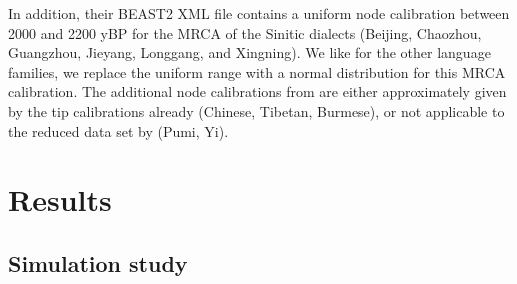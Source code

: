 \documentclass[]{rsos}%
\begin{document}
In addition, their BEAST2 XML file contains a uniform node calibration between 2000 and 2200 yBP for the MRCA of the Sinitic dialects (Beijing, Chaozhou, Guangzhou, Jieyang, Longgang, and Xingning). We like for the other language families, we replace the uniform range with a normal distribution for this MRCA calibration.
The additional node calibrations from \textcite{zhang2019phylogenetic} are either approximately given by the tip calibrations already (Chinese, Tibetan, Burmese), or not applicable to the reduced data set by \textcite{sagart2019dated} (Pumi, Yi).


\section{Results}\label{s:results}

\subsection{Simulation study}
\end{document}

